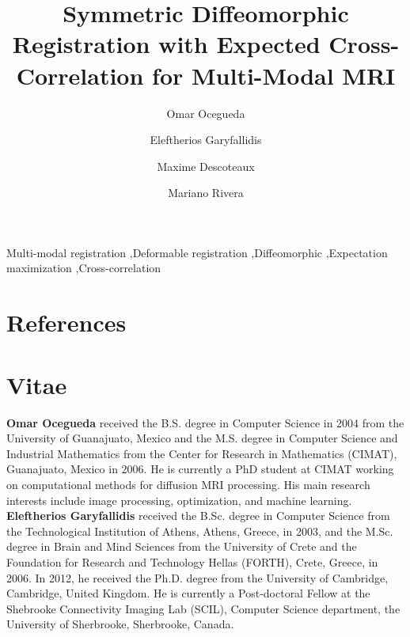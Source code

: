 \documentclass[authoryear,preprint,review,9pt]{elsarticle}
\begin{document}
\begin{frontmatter}

\title{\textbf{Symmetric Diffeomorphic Registration with Expected Cross-Correlation for Multi-Modal MRI}}
\author[cimat]{Omar Ocegueda}

\author[scil]{Eleftherios Garyfallidis}

\author[scil]{Maxime Descoteaux}

\author[cimat]{Mariano Rivera}

\address[cimat]{Centro de Investigaci\'{o}n en Matem\'{a}ticas, Guanajuato, Gto, M\'{e}xico}
\address[scil]{Computer Science Department, Universit\'{e} de Sherbrooke, Sherbrooke, Qu\'{e}bec, Canada}



\begin{keyword}
Multi-modal registration \sep Deformable registration \sep Diffeomorphic \sep Expectation maximization \sep Cross-correlation
\end{keyword}

\end{frontmatter}










\clearpage
\section*{References}



\clearpage
\section*{Vitae}
\textbf{Omar Ocegueda} received the B.S. degree in Computer Science in 2004 from the University of Guanajuato, Mexico and the M.S. degree in Computer Science and Industrial Mathematics from the Center for Research in Mathematics (CIMAT), Guanajuato, Mexico in 2006. He is currently a PhD student at CIMAT working on computational methods for diffusion MRI processing. His main research interests include image processing, optimization, and machine learning.\\

\textbf{Eleftherios Garyfallidis} received the B.Sc. degree in Computer Science from the Technological Institution of Athens, Athens, Greece, in 2003, and the M.Sc. degree in Brain and Mind Sciences from the University of Crete and the Foundation for Research and Technology Hellas (FORTH), Crete, Greece, in 2006. In 2012, he received  the Ph.D. degree from the University of Cambridge, Cambridge, United Kingdom. He is currently a Post-doctoral Fellow at the Shebrooke Connectivity Imaging Lab (SCIL), Computer Science department, the University of Sherbrooke, Sherbrooke, Canada.\\
\end{document}
